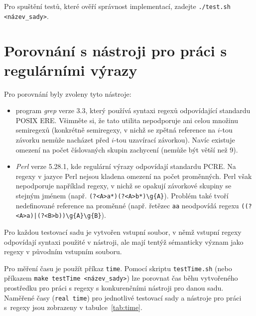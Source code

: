 \documentclass[thesis=B,czech]{FITthesis}[2019/12/23]
\theoremstyle{definition}
\begin{document}
Pro spuštění testů, které ověří správnost implementací, zadejte \texttt{./test.sh <název\_sady>}.  

\section{Porovnání s nástroji pro práci s regulárními výrazy}
 Pro porovnání byly zvoleny tyto nástroje:
 \begin{itemize}
	\item{program \emph{grep} verze 3.3, který používá syntaxi regexů odpovídající standardu POSIX ERE. Všimněte si, že tato utilita nepodporuje ani celou množinu semiregexů (konkrétně semiregexy, v nichž se zpětná reference na $i$-tou závorku nemůže nacházet před $i$-tou uzavírací závorkou). Navíc existuje omezení na počet číslovaných skupin zachycení (nemůže být větší než 9).}
	\item{\emph{Perl} verze 5.28.1, kde regulární výrazy odpovídají standardu PCRE. Na regexy v jazyce Perl nejsou kladena omezení na počet proměnných. Perl však nepodporuje například regexy, v nichž se opakují závorkové skupiny se stejným jménem (např. \texttt{(?<A>a*)(?<A>b*)\textbackslash g\{A\}}). Problém také tvoří nedefinované reference na proměnné (např. řetězec \texttt{aa} neodpovídá regexu \texttt{((?<A>a)|(?<B>b))\textbackslash g\{A\}\textbackslash g\{B\}}). }
 \end{itemize}

Pro každou testovací sadu je vytvořen vstupní soubor, v němž vstupní regexy odpovídají syntaxi použité v nástroji, ale mají tentýž sémanticky význam jako regexy v původním vstupním souboru.   

Pro měření času je použít příkaz \texttt{time}. Pomocí skriptu \texttt{testTime.sh} (nebo příkazem \texttt{make testTime <název\_sady>}) lze porovnat čas běhu vytvořeného prostředku pro práci s regexy s konkurenčními nástroji pro danou sadu. 
Naměřené časy (\texttt{real time}) pro jednotlivé testovací sady a nástroje pro práci s~regexy jsou zobrazeny v tabulce~\ref{tab:time}. 
\end{document}
